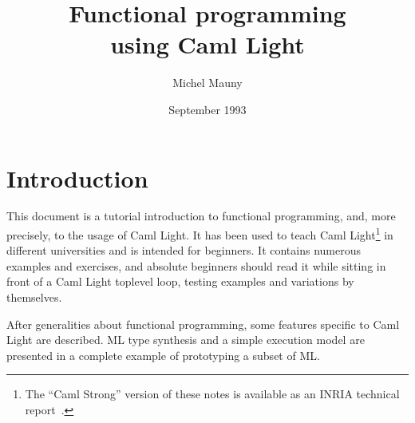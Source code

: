 \title{Functional programming \\ using Caml Light}
\author{Michel Mauny}
\date{September 1993}

\emergencystretch=50pt  %
\setcounter{tocdepth}{1}        %
\def\CAMLVERSION{0.6}
\newtheorem{exoth}{Exercise}[chapter]
\def\exo{\begin{exoth}\ifx\exofont\undefined\else\exofont\fi}
\def\endexo{\end{exoth}}
\def\Example{\paragraph{Example}}
\def\End{\par\noindent$\Box$\par}
\def\ikwd#1{}



\maketitle

\cleardoublepage

\tableofcontents

\chapter{Introduction}

This document is a tutorial introduction to functional programming, and,
more precisely, to the usage of Caml Light.  It has been used to teach
Caml Light\footnote{The ``Caml Strong'' version of these notes is available
as an INRIA technical report~\cite{BDC}.} in different universities
and is intended for beginners. It contains numerous examples and
exercises, and absolute beginners should read it while sitting in
front of a Caml Light toplevel loop, testing examples and variations
by themselves.

After generalities about functional programming, some features
specific to Caml Light are described. ML type synthesis and a simple
execution model are presented in a complete example of prototyping a
subset of ML.


